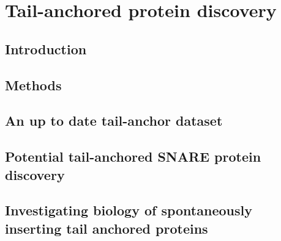 \chapter{Tail-anchored protein discovery} %
\section{Introduction}
\section{Methods}
\section{An up to date tail-anchor dataset}
\section{Potential tail-anchored SNARE protein discovery}
\section{Investigating biology of spontaneously inserting tail anchored proteins}
